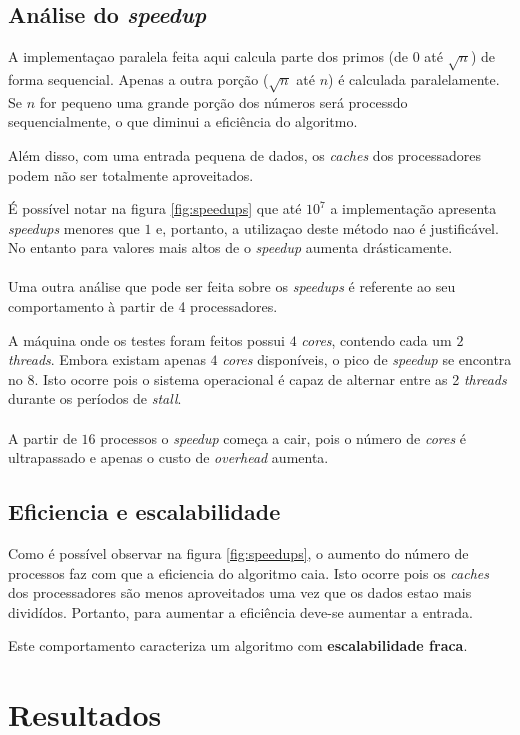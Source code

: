 \documentclass[a4paper, 12 pt]{article}
\begin{document}
\subsection{Análise do \textit{speedup}}
A implementaçao paralela feita aqui calcula parte dos primos (de $0$ até $\sqrt{n}$) de forma sequencial.
Apenas a outra porção ($\sqrt{n}$ até $n$) é calculada paralelamente. Se $n$ for pequeno uma grande porção
dos números será processdo sequencialmente, o que diminui a eficiência do algoritmo.

Além disso, com uma entrada pequena de dados, os \textit{caches} dos processadores podem não ser totalmente aproveitados.

É possível notar na figura \ref{fig:speedups} que até $10^7$ a implementação apresenta \textit{speedups} menores que $1$ e, portanto, 
a utilizaçao deste método nao é justificável. No entanto para valores mais altos de o \textit{speedup} aumenta drásticamente.
\\\\
Uma outra análise que pode ser feita sobre os \textit{speedups} é referente ao seu comportamento
à partir de 4 processadores. 

A máquina onde os testes foram feitos possui $4$ \textit{cores}, contendo cada um $2$ \textit{threads}.
Embora existam apenas $4$ \textit{cores} disponíveis, o pico de \textit{speedup}
se encontra no $8$. Isto ocorre pois o sistema operacional é capaz de alternar entre as 2 \textit{threads} 
durante os períodos de \textit{stall}.
\\\\
A partir de $16$ processos o \textit{speedup} começa a cair, pois o número de \textit{cores} 
é ultrapassado e apenas o custo de \textit{overhead} aumenta.

\subsection{Eficiencia e escalabilidade}

Como é possível observar na figura \ref{fig:speedups}, o aumento do número de processos
faz com que a eficiencia do algoritmo caia. Isto ocorre pois os \textit{caches} dos
processadores são menos aproveitados uma vez que os dados estao mais dividídos. Portanto, para aumentar a
eficiência deve-se aumentar a entrada.

Este comportamento caracteriza um algoritmo com \textbf{escalabilidade fraca}.

\section{Resultados}
\end{document}
